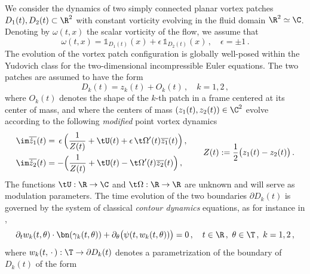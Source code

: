 \documentclass[a4paper,reqno,10pt]{article}
\newcommand{\pa}{\partial}
\begin{document}
We consider the dynamics of two simply connected planar vortex patches 
$D_1(t), D_2(t) \subset \R^2$ with constant vorticity evolving in the fluid domain 
$\R^2 \simeq \C$. Denoting by $\omega(t,x)$ the scalar vorticity of the flow, we assume that
\begin{equation}
	\omega(t,x) = {\mathds{1}}_{D_1(t)}(x) + \epsilon\, {\mathds{1}}_{D_2(t)}(x) \,, \quad \epsilon= \pm 1\,.
\end{equation}
The evolution of the vortex patch configuration is globally well-posed within the Yudovich class for the two-dimensional incompressible Euler equations. The two patches are assumed to have the form
\begin{equation}\label{patches.form}
	D_{k}(t) = z_k(t) + O_{k}(t) \,, \quad k=1,2\,,
\end{equation}
where $O_k(t)$ denotes the shape of the $k$-th patch in a frame centered at its center of mass, and where the centers of mass $(z_1(t),z_2(t)) \in \C^2$ evolve according to the following {\it modified} point vortex dynamics
\begin{equation}\label{point.dyn.app}
	\begin{aligned}
		 \im \overline{\dot{z}_1} (t) & = \, \epsilon\,  \Big(\frac{1}{Z(t)} + \tU(t) +\epsilon \,\t\Omega'(t) \overline{z_1}(t) \Big) \,, \\
			\im   \overline{\dot{z}_2} (t) & =   - \Big(\frac{1}{Z(t)} + \tU(t) -  \t\Omega'(t) \overline{z_2}(t)\Big)\,,
	\end{aligned} \quad \quad  Z(t) :=\frac12 \big( z_{1}(t) - z_{2}(t) \big)\,.
\end{equation}
The functions $\tU:\R\to\C$ and $\t\Omega:\R\to\R$ are unknown and will serve as modulation parameters. The time evolution of the two boundaries $\partial D_k(t)$ is governed by the system of classical {\it contour dynamics} equations, as for instance in \cite{BertozziMajda,chemin},
\begin{equation}\label{contour.dyn.app}
	\pa_{t} w_{k}(t,\theta) \cdot \bn(\gamma_{k}(t,\theta))  + \pa_{\theta} \big( \psi(t,w_{k}(t,\theta)) \big) =0 \,, \quad t\in \R\,, \ \theta\in \T\,, \ k=1,2 \,,
\end{equation}
where $w_k(t,\,\cdot\,):\T\to \partial D_k(t)$ denotes a parametrization of the boundary of $D_k(t)$ of the form
\end{document}

